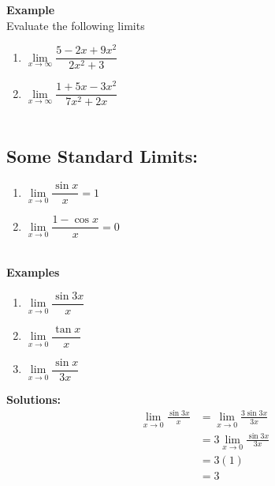 \documentclass[11pt,a4paper]{article}
\begin{document}
\textbf{Example}\\
Evaluate the following limits
\begin{enumerate}
\item $\lim\limits_{x\longrightarrow \infty} \dfrac{5-2x+9x^2}{2x^2+3}$
\item $\lim\limits_{x\longrightarrow \infty} \dfrac{1+5x-3x^2}{7x^2+2x}$\\\\
\end{enumerate}






\subsection{Some Standard Limits:}
\begin{enumerate}
\item $\lim\limits_{x\longrightarrow 0} \dfrac{\sin x}{x}=1$
\item $\lim \limits_{x\longrightarrow 0} \dfrac{1-\cos x}{x}=0$\\\\
\end{enumerate}

\textbf{Examples}
\begin{enumerate}
\item $\lim\limits_{x\longrightarrow 0} \dfrac{\sin 3x}{x}$
\item $\lim\limits_{x\longrightarrow 0} \dfrac{\tan x}{x}$
\item $\lim\limits_{x\longrightarrow 0} \dfrac{\sin x}{3x}$\\
\end{enumerate}

\textbf{Solutions:}
\begin{align*}
\lim_{x\longrightarrow 0} \frac{\sin 3x}{x} & = \lim_{x\longrightarrow 0} \frac{3\sin 3x}{3x}\\
                                            & = 3 \lim_{x\longrightarrow 0} \frac{\sin 3x}{3x}\\
                                            & = 3(1)\\
                                            & = 3\\
\end{align*}
\end{document}

